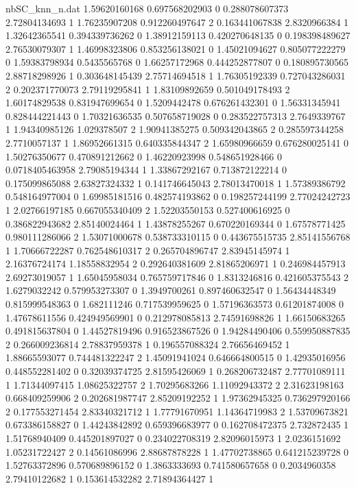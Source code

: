 \begin{filecontents}{nbSC_knn_n.dat}
1.59620160168 0.697568202903 0
0.288078607373 2.72804134693 1
1.76235907208 0.912260497647 2
0.163441067838 2.8320966384 1
1.32642365541 0.394339736262 0
1.38912159113 0.420270648135 0
0.198398489627 2.76530079307 1
1.46998323806 0.853256138021 0
1.45021094627 0.805077222279 0
1.59383798934 0.5435565768 0
1.66257172968 0.444252877807 0
0.180895730565 2.88718298926 1
0.303648145439 2.75714694518 1
1.76305192339 0.727043286031 2
0.202371770073 2.79119295841 1
1.83109892659 0.501049178493 2
1.60174829538 0.831947699654 0
1.5209442478 0.676261432301 0
1.56331345941 0.828444221443 0
1.70321636535 0.507658719028 0
0.283522757313 2.7649339767 1
1.94340985126 1.029378507 2
1.90941385275 0.509342043865 2
0.285597344258 2.7710057137 1
1.86952661315 0.640335844347 2
1.65980966659 0.676280025141 0
1.50276350677 0.470891212662 0
1.46220923998 0.548651928466 0
0.0718405463958 2.79085194344 1
1.33867292167 0.713872122214 0
0.175099865088 2.63827324332 1
0.141746645043 2.78013470018 1
1.57389386792 0.548164977004 0
1.69985181516 0.482574193862 0
0.198257244199 2.77024242723 1
2.02766197185 0.667055340409 2
1.52203550153 0.527400616925 0
0.386822943682 2.85140024464 1
1.43878255267 0.670220169344 0
1.67578771425 0.980111286066 2
1.53071000678 0.538733310115 0
0.443675515735 2.85141556768 1
1.70666722287 0.762548610317 2
0.265704896747 2.83945145974 1
2.16376724174 1.18558832954 2
0.292640381609 2.81865206971 1
0.246984457913 2.69273019057 1
1.65045958034 0.765759717846 0
1.8313246816 0.421605375543 2
1.6279032242 0.579953273307 0
1.3949700261 0.897460632547 0
1.56434448349 0.815999548363 0
1.682111246 0.717539959625 0
1.57196363573 0.61201874008 0
1.47678611556 0.424949569901 0
0.212978085813 2.74591698826 1
1.66150683265 0.491815637804 0
1.44527819496 0.916523867526 0
1.94284490406 0.559950887835 2
0.266009236814 2.78837959378 1
0.196557088324 2.76656469452 1
1.88665593077 0.744481322247 2
1.45091941024 0.646664800515 0
1.42935016956 0.448552281402 0
0.32039374725 2.81595426069 1
0.268206732487 2.77701089111 1
1.71344097415 1.08625322757 2
1.70295683266 1.11092943372 2
2.31623198163 0.668409259906 2
0.202681987747 2.85209192252 1
1.97362945325 0.736297920166 2
0.177553271454 2.83340321712 1
1.77791670951 1.14364719983 2
1.53709673821 0.673386158827 0
1.44243842892 0.659396683977 0
0.162708472375 2.732872435 1
1.51768940409 0.445201897027 0
0.234022708319 2.82096015973 1
2.0236151692 1.05231722427 2
0.14561086996 2.88687878228 1
1.47702738865 0.641215239728 0
1.52763372896 0.570689896152 0
1.3863333693 0.741580657658 0
0.2034960358 2.79410122682 1
0.153614532282 2.71894364427 1

\end{filecontents}
